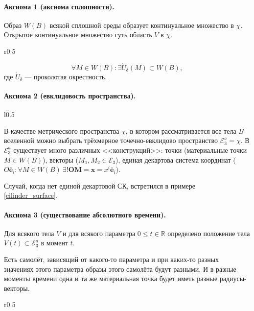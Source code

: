 \paragraph{Аксиома 1 (аксиома сплошности).} Образ $W(B)$ всякой сплошной среды образует континуальное
множество в $\chi$. Открытое континуальное множество суть область $V$ в $\chi$.

\begin{wrapfigure}{r}{0.5\textwidth}
	\centering
	
\end{wrapfigure}

\[
  \forall M \in W(B)\colon \exists \mathring{U}_\delta (M) \subset W(B),
\]
где $\mathring{U}_\delta$ --- проколотая окрестность.
\vspace{45pt}

\paragraph{Аксиома 2 (евклидовость пространства).} 
\begin{wrapfigure}{l}{0.5\textwidth}
	\centering
	
\end{wrapfigure}
В качестве метрического пространства $\chi$,
в котором рассматривается все тела $B$ вселенной можно выбрать трёхмерное 
точечно-евклидово пространство $\mathcal{E}^a_3 = \chi$. В $\mathcal{E}_3^a$
существует много различных <<конструкций>>: точки (материальные точки
$M \in W(B)$), векторы ($M_1, M_2 \in \mathcal{E}_3$), единая декартова система координат
($O\bar{\mathbf{e}}_i\colon \forall M \in W(B) \ \exists! \mathbf{OM} = \mathbf
x = x^i \bar{\mathbf{e}}_i$).

Случай, когда нет единой декартовой СК, встретился в примере \ref{cilinder_surface}.

\paragraph{Аксиома 3 (существование абсолютного времени).} 
Для всякого тела $V$ и для всякого
параметра $0 \leqslant t \in \mathbb{R}$ определено положение тела $V(t)
\subset \mathcal{E}_3^a$ в момент $ t $.

Есть самолёт, зависящий от какого-то параметра и при каких-то разных значениях этого параметра 
образы этого самолёта будут разными. И в разные моменты времени одна и та же материальная точка
будет иметь разные радиусы-векторы.

\begin{wrapfigure}{r}{0.5\textwidth}
	\centering
	
\end{wrapfigure}

